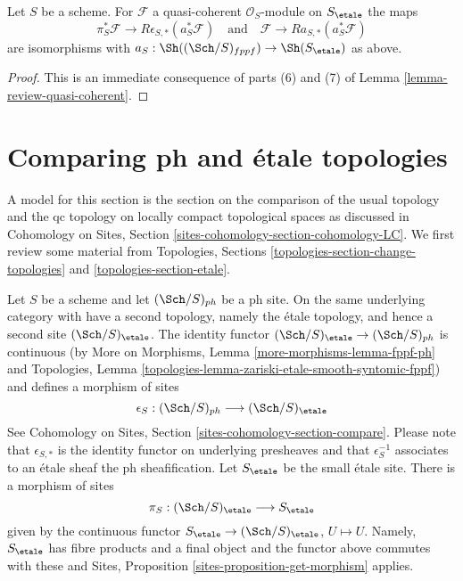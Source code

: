 \begin{lemma}
\label{lemma-cohomological-descent-etale-fppf-modules}
Let $S$ be a scheme. For $\mathcal{F}$ a quasi-coherent
$\mathcal{O}_S$-module on $S_\etale$ the maps
$$
\pi_S^*\mathcal{F} \longrightarrow R\epsilon_{S, *}(a_S^*\mathcal{F})
\quad\text{and}\quad
\mathcal{F} \longrightarrow Ra_{S, *}(a_S^*\mathcal{F})
$$
are isomorphisms with
$a_S : \Sh((\Sch/S)_{fppf}) \to \Sh(S_\etale)$ as above.
\end{lemma}

\begin{proof}
This is an immediate consequence of
parts (6) and (7) of
Lemma \ref{lemma-review-quasi-coherent}.
\end{proof}







\section{Comparing ph and \'etale topologies}
\label{section-ph-etale}

\noindent
A model for this section is the section on the comparison of the
usual topology and the qc topology on locally compact topological
spaces as discussed in Cohomology on Sites, Section
\ref{sites-cohomology-section-cohomology-LC}.
We first review some material from
Topologies, Sections
\ref{topologies-section-change-topologies} and
\ref{topologies-section-etale}.

\medskip\noindent
Let $S$ be a scheme and let $(\Sch/S)_{ph}$ be a ph site.
On the same underlying category with have a second topology,
namely the \'etale topology, and hence a second site
$(\Sch/S)_\etale$. The identity functor
$(\Sch/S)_\etale \to (\Sch/S)_{ph}$ is continuous
(by More on Morphisms, Lemma \ref{more-morphisms-lemma-fppf-ph}
and Topologies, Lemma
\ref{topologies-lemma-zariski-etale-smooth-syntomic-fppf})
and defines a morphism of sites
$$
\epsilon_S : (\Sch/S)_{ph} \longrightarrow (\Sch/S)_\etale
$$
See Cohomology on Sites, Section \ref{sites-cohomology-section-compare}.
Please note that $\epsilon_{S, *}$ is the identity functor on underlying
presheaves and that $\epsilon_S^{-1}$ associates to an \'etale sheaf the
ph sheafification.
Let $S_\etale$ be the small \'etale site.
There is a morphism of sites
$$
\pi_S : (\Sch/S)_\etale \longrightarrow S_\etale
$$
given by the continuous functor
$S_\etale \to (\Sch/S)_\etale$, $U \mapsto U$.
Namely, $S_\etale$ has fibre products and a final object and the
functor above commutes with these and
Sites, Proposition \ref{sites-proposition-get-morphism} applies.

